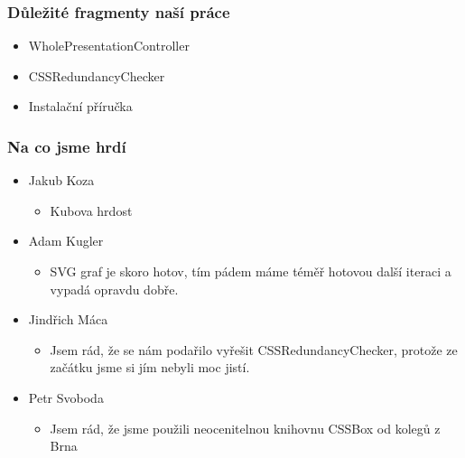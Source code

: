 \documentclass{beamer}
\begin{document}
\begin{frame}[allowframebreaks]\frametitle{Důležité fragmenty naší práce}
  \begin{itemize}
    \item WholePresentationController
		\item CSSRedundancyChecker
		\item Instalační příručka
  \end{itemize}
\end{frame}

\begin{frame}[allowframebreaks]\frametitle{Na co jsme hrdí} 
  \begin{itemize}
    \item Jakub Koza
      \begin{itemize}
       \item Kubova hrdost
     \end{itemize}
   
    \item Adam Kugler
      \begin{itemize}
       \item SVG graf je skoro hotov, tím pádem máme téměř hotovou další iteraci a vypadá opravdu dobře.
     \end{itemize}

    \item Jindřich Máca
      \begin{itemize}
       \item Jsem rád, že se nám podařilo vyřešit CSSRedundancyChecker, protože ze začátku jsme si jím nebyli moc jistí.
      \end{itemize}  
   
    \item Petr Svoboda
      \begin{itemize}
       \item Jsem rád, že jsme použili neocenitelnou knihovnu CSSBox od kolegů z Brna
     \end{itemize}
   \end{itemize}  
\end{frame}
\end{document}
